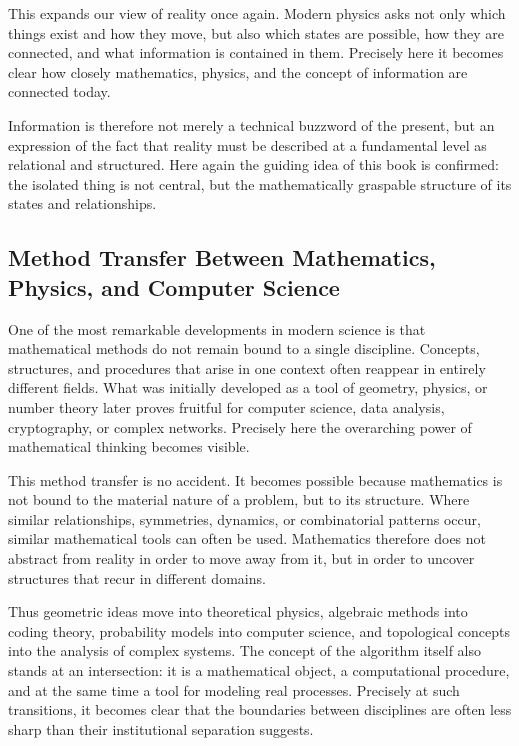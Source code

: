 This expands our view of reality once again.
Modern physics asks not only
which things exist and how they move,
but also
which states are possible,
how they are connected,
and what information is contained in them.
Precisely here it becomes clear
how closely mathematics,
physics,
and the concept of information
are connected today.

Information is therefore not merely a technical buzzword of the present,
but an expression of the fact
that reality must be described at a fundamental level
as relational and structured.
Here again the guiding idea of this book is confirmed:
the isolated thing is not central,
but the mathematically graspable structure
of its states and relationships.


\subsection{Method Transfer Between Mathematics, Physics, and Computer Science}

One of the most remarkable developments in modern science
is that mathematical methods do not remain bound to a single discipline.
Concepts, structures, and procedures
that arise in one context
often reappear in entirely different fields.
What was initially developed as a tool of geometry,
physics,
or number theory
later proves fruitful for computer science,
data analysis,
cryptography,
or complex networks.
Precisely here the overarching power of mathematical thinking becomes visible.

This method transfer is no accident.
It becomes possible
because mathematics is not bound to the material nature of a problem,
but to its structure.
Where similar relationships,
symmetries,
dynamics,
or combinatorial patterns occur,
similar mathematical tools can often be used.
Mathematics therefore does not abstract from reality
in order to move away from it,
but in order to uncover structures
that recur in different domains.

Thus geometric ideas move into theoretical physics,
algebraic methods into coding theory,
probability models into computer science,
and topological concepts into the analysis of complex systems.
The concept of the algorithm itself also stands at an intersection:
it is a mathematical object,
a computational procedure,
and at the same time a tool for modeling real processes.
Precisely at such transitions,
it becomes clear
that the boundaries between disciplines
are often less sharp
than their institutional separation suggests.

